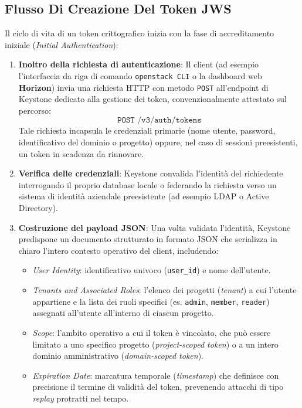 \documentclass[11pt, a4paper]{article}
\begin{document}

\subsection{Flusso Di Creazione Del Token JWS}

Il ciclo di vita di un token crittografico inizia con la fase di accreditamento iniziale (\emph{Initial Authentication}):
\begin{enumerate}
    \item \textbf{Inoltro della richiesta di autenticazione}: Il client (ad esempio l'interfaccia da riga di comando \texttt{openstack CLI} o la dashboard web \textbf{Horizon}) invia una richiesta HTTP con metodo \texttt{POST} all'endpoint di Keystone dedicato alla gestione dei token, convenzionalmente attestato sul percorso:
    \[
    \texttt{POST /v3/auth/tokens}
    \]
    Tale richiesta incapsula le credenziali primarie (nome utente, password, identificativo del dominio o progetto) oppure, nel caso di sessioni preesistenti, un token in scadenza da rinnovare.

    \item \textbf{Verifica delle credenziali}: Keystone convalida l'identità del richiedente interrogando il proprio database locale o federando la richiesta verso un sistema di identità aziendale preesistente (ad esempio LDAP o Active Directory).

    \item \textbf{Costruzione del payload JSON}: Una volta validata l'identità, Keystone predispone un documento strutturato in formato JSON che serializza in chiaro l'intero contesto operativo del client, includendo:
    \begin{itemize}[noitemsep]
        \item \emph{User Identity}: identificativo univoco (\texttt{user\_id}) e nome dell'utente.
        \item \emph{Tenants and Associated Roles}: l'elenco dei progetti (\emph{tenant}) a cui l'utente appartiene e la lista dei ruoli specifici (es. \texttt{admin}, \texttt{member}, \texttt{reader}) assegnati all'utente all'interno di ciascun progetto.
        \item \emph{Scope}: l'ambito operativo a cui il token è vincolato, che può essere limitato a uno specifico progetto (\emph{project-scoped token}) o a un intero dominio amministrativo (\emph{domain-scoped token}).
        \item \emph{Expiration Date}: marcatura temporale (\emph{timestamp}) che definisce con precisione il termine di validità del token, prevenendo attacchi di tipo \emph{replay} protratti nel tempo.
    \end{itemize}


\end{enumerate}
\end{document}
